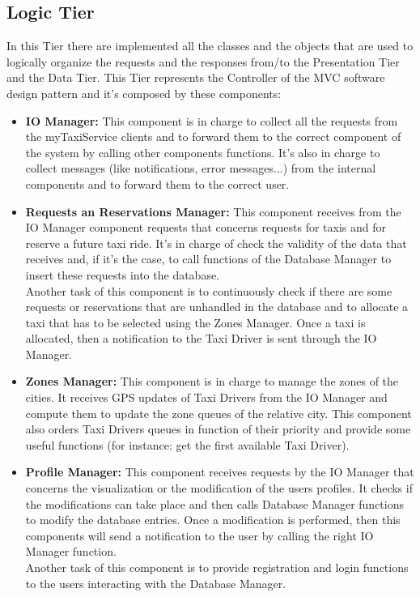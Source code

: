 \documentclass[../../../../../../dd.tex]{subfiles}
\begin{document}
	\subsection{Logic Tier}
		In this Tier there are implemented all the classes and the objects that are used to logically organize the requests and the responses from/to the Presentation Tier and the Data Tier.
		This Tier represents the Controller of the MVC software design pattern and it's composed by these components:

		\begin{itemize}
			\item \textbf{IO Manager:} This component is in charge to collect all the requests from the myTaxiService clients and to forward them to the correct component of the system by calling other components functions. It's also in charge to collect messages (like notifications, error messages...) from the internal components and to forward them to the correct user.

			\item \textbf{Requests an Reservations Manager:} This component receives from the IO Manager component requests that concerns requests for taxis and for reserve a future taxi ride. It's in charge of check the validity of the data that receives and, if it's the case, to call functions of the Database Manager to insert these requests into the database.
			\\
			Another task of this component is to continuously check if there are some requests or reservations that are unhandled in the database and to allocate a taxi that has to be selected using the Zones Manager. Once a taxi is allocated, then a notification to the Taxi Driver is sent through the IO Manager.

			\item \textbf{Zones Manager:} This component is in charge to manage the zones of the cities. It receives GPS updates of Taxi Drivers from the IO Manager and compute them to update the zone queues of the relative city. This component also orders Taxi Drivers queues in function of their priority and provide some useful functions (for instance: get the first available Taxi Driver).

			\item \textbf{Profile Manager:} This component receives requests by the IO Manager that concerns the visualization or the modification of the users profiles. It checks if the modifications can take place and then calls Database Manager functions to modify the database entries. Once a modification is performed, then this components will send a notification to the user by calling the right IO Manager function.
			\\
			Another task of this component is to provide registration and login functions to the users interacting with the Database Manager.
			
		\end{itemize}
	
\end{document}
